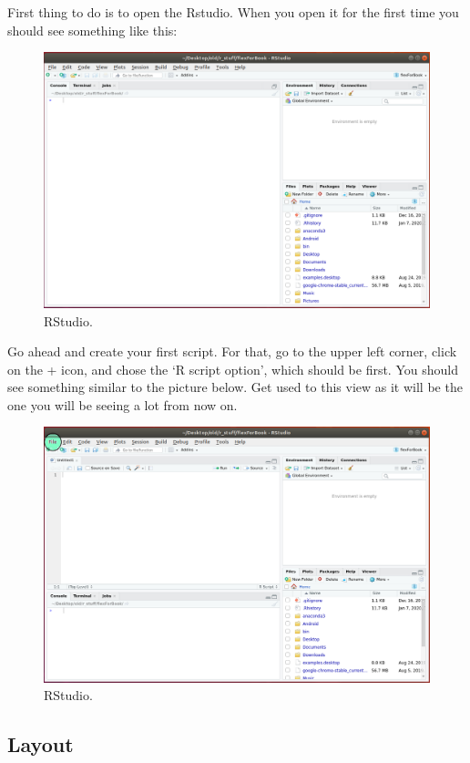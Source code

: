 \documentclass[]{book}
\begin{document}
First thing to do is to open the Rstudio. When you open it for the first time you should see something like this:

\begin{figure}
\centering
\includegraphics{rstudio.png}
\caption{RStudio.}
\end{figure}

Go ahead and create your first script. For that, go to the upper left corner, click on the + icon, and chose the `R script option', which should be first. You should see something similar to the picture below. Get used to this view as it will be the one you will be seeing a lot from now on.

\begin{figure}
\centering
\includegraphics{rstudio1.png}
\caption{RStudio.}
\end{figure}

\hypertarget{layout}{%
\subsection{Layout}\label{layout}}
\end{document}
